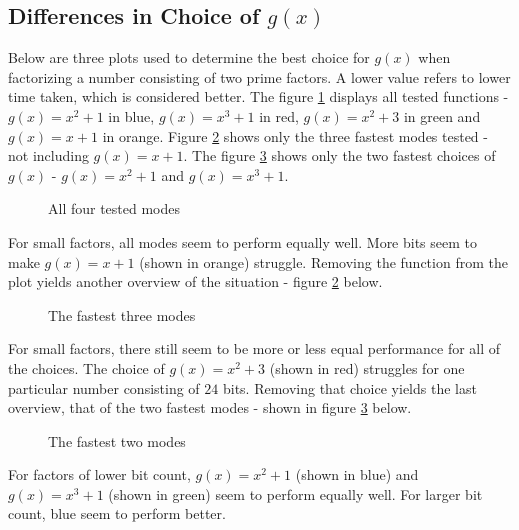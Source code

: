 \subsection{Differences in Choice of $g(x)$}
Below are three plots used to determine the best choice for $g(x)$ when factorizing a number consisting of two prime factors. A lower value refers to lower time taken, which is considered better. The figure \ref{fig:pollardsAllModes} displays all tested functions - $g(x)=x^2+1$ in blue, $g(x)=x^3+1$ in red, $g(x)=x^2+3$ in green and $g(x)=x+1$ in orange. Figure \ref{fig:pollardsFasterModes} shows only the three fastest modes tested - not including $g(x)=x+1$. The figure \ref{fig:pollardsFastestModes} shows only the two fastest choices of $g(x)$ - $g(x)=x^2+1$ and $g(x)=x^3+1$.

\begin{figure}[H]
    \centering
    
    \vspace{-0.3cm}
    \caption{All four tested modes}\label{fig:pollardsAllModes}
\end{figure}

For small factors, all modes seem to perform equally well. More bits seem to make $g(x)=x+1$ (shown in orange) struggle. Removing the function from the plot yields another overview of the situation - figure \ref{fig:pollardsFasterModes} below.

\begin{figure}[H]
    \centering
    
    \vspace{-0.3cm}
    \caption{The fastest three modes}\label{fig:pollardsFasterModes}
\end{figure}

For small factors, there still seem to be more or less equal performance for all of the choices. The choice of $g(x)=x^2+3$ (shown in red) struggles for one particular number consisting of $24$ bits. Removing that choice yields the last overview, that of the two fastest modes - shown in figure \ref{fig:pollardsFastestModes} below.

\begin{figure}[H]
    \centering
    
    \vspace{-0.3cm}
    \caption{The fastest two modes}\label{fig:pollardsFastestModes}
\end{figure}

For factors of lower bit count, $g(x)=x^2+1$ (shown in blue) and $g(x)=x^3+1$ (shown in green) seem to perform equally well. For larger bit count, blue seem to perform better.

